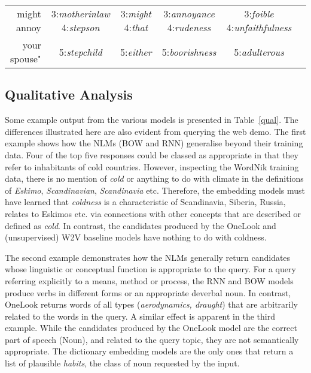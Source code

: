 \documentclass[11pt,letterpaper]{article}
\begin{document}
\begin{table*}[ht]
{\begin{tabular}{r|ccccc|}
might annoy & 3:\emph{motherinlaw} 4:\emph{stepson} &   3:\emph{might} 4:\emph{that}  & 3:\emph{annoyance} 4:\emph{rudeness} & 3:\emph{foible} 4:\emph{unfaithfulness}\\
 your spouse" & 5:\emph{stepchild} &  5:\emph{either} &  5:\emph{boorishness} &  5:\emph{adulterous} \\

\end{tabular}}
\hfill{}
\caption{The top-five candidates for example queries (invented by the authors) from different reverse dictionary models. Both the RNN and BOW models are without Word2Vec input and use the cosine loss.}
\label{qual}
\end{table*}

\subsection{Qualitative Analysis}

Some example output from the various models is presented in Table~\ref{qual}. The differences illustrated here are also evident from querying the web demo. The first example shows how the NLMs (BOW and RNN) generalise beyond their training data. Four of the top five responses could be classed as appropriate in that they refer to inhabitants of cold countries. However, inspecting the WordNik training data, there is no mention of \emph{cold} or anything to do with climate in the definitions of \emph{Eskimo}, \emph{Scandinavian}, \emph{Scandinavia} etc. Therefore, the embedding models must have learned that \emph{coldness} is a characteristic of Scandinavia, Siberia, Russia, relates to Eskimos etc. via connections with other concepts that are described or defined as \emph{cold}. In contrast, the candidates produced by the OneLook and (unsupervised) W2V baseline models have nothing to do with coldness.

The second example demonstrates how the NLMs generally return candidates whose linguistic or conceptual function is appropriate to the query. For a query referring explicitly to a means, method or process, the RNN and BOW models produce verbs in different forms or an appropriate deverbal noun. In contrast, OneLook returns words of all types (\emph{aerodynamics, draught}) that are arbitrarily related to the words in the query. A similar effect  is apparent in the third example. While the candidates produced by the OneLook model are the correct part of speech (Noun), and related to the query topic, they are not semantically appropriate. The dictionary embedding models are the only ones that return a list of plausible \emph{habits}, the class of noun requested by the input.  
\end{document}
